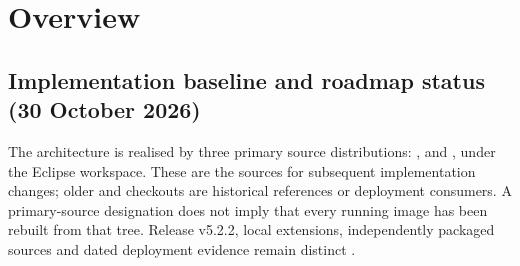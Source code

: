 \documentclass[a4paper]{arrowhead}
\begin{document}
\begin{center}
\begin{abstract}
    The primary purpose of the document is to present the functionality offered by the Arrowhead
    Core and Support systems. Its architectural aspects are defined in the abstract: no specific
    implementation or technology is endorsed. Where the 5.2.2 implementations made the abstract
    design concrete -- service names, operations, policies -- this document follows them, and
    refers to the white-box GSoSDDs \cite{gsosddcore,gsosddsup} and to the per-system SysD, SD
    and IDD documents for implementation detail. The document supersedes \emph{GSoSD Arrowhead
    Core Systems 5.0 v1.2} \cite{gsosd50} and the draft \emph{GSoSD Arrowhead Support Systems 5.0}
    \cite{gsosdsup50}.
  \end{abstract}

  \vspace*{0.6cm}
\end{center}

\newpage
\tableofcontents
\newpage

\section{Overview}
\label{sec:overview}



\subsection{Implementation baseline and roadmap status (30 October 2026)}
\label{sec:baseline-20261030}
The architecture is realised by three primary source distributions:
,  and
, under the Eclipse workspace. These are the
sources for subsequent implementation changes; older  and
 checkouts are historical references or deployment consumers.
A primary-source designation does not imply that every running image has been
rebuilt from that tree. Release v5.2.2, local extensions, independently packaged
sources and dated deployment evidence remain distinct \cite{primaryBaseline20261030}.
\end{document}
